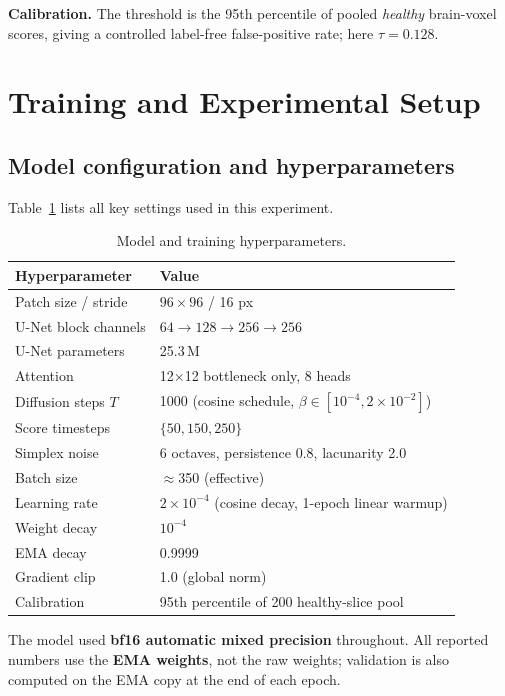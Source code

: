 \documentclass[12pt, a4paper]{article}
\theoremstyle{definition}\newtheorem{definition}{Definition}
\begin{document}
\textbf{Calibration.} The threshold is the 95th percentile of pooled \emph{healthy}
brain-voxel scores, giving a controlled label-free false-positive rate; here
$\tau=0.128$.

\section{Training and Experimental Setup}
\label{sec:setup}

\subsection{Model configuration and hyperparameters}
Table~\ref{tab:hparams} lists all key settings used in this experiment.

\begin{table}[htbp]\centering\small
\caption{Model and training hyperparameters.}
\label{tab:hparams}
\begin{tabular}{@{}ll@{}}
\toprule
\textbf{Hyperparameter} & \textbf{Value} \\
\midrule
Patch size / stride & $96{\times}96$ / 16 px \\
U-Net block channels & $64 \to 128 \to 256 \to 256$ \\
U-Net parameters & 25.3\,M \\
Attention & 12${\times}$12 bottleneck only, 8 heads \\
Diffusion steps $T$ & 1000 (cosine schedule, $\beta\in[10^{-4},2{\times}10^{-2}]$) \\
Score timesteps & $\{50, 150, 250\}$ \\
Simplex noise & 6 octaves, persistence 0.8, lacunarity 2.0 \\
Batch size & $\approx$350 (effective) \\
Learning rate & $2{\times}10^{-4}$ (cosine decay, 1-epoch linear warmup) \\
Weight decay & $10^{-4}$ \\
EMA decay & 0.9999 \\
Gradient clip & 1.0 (global norm) \\
Calibration & 95th percentile of 200 healthy-slice pool \\
\bottomrule
\end{tabular}
\end{table}

The model used \textbf{bf16 automatic mixed precision} throughout. All reported numbers
use the \textbf{EMA weights}, not the raw weights; validation is also computed on the EMA
copy at the end of each epoch.
\end{document}
